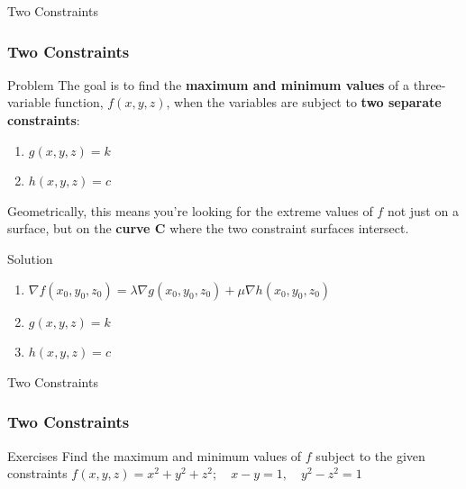 \documentclass[aspectratio=169, UTF8]{beamer}
\begin{document}
\begin{frame}{Two Constraints}
    \frametitle{Two Constraints}
    \begin{block}{Problem}
        The goal is to find the \textbf{maximum and minimum values} of a three-variable function, $f(x, y, z)$, when the variables are subject to \textbf{two separate constraints}:

        \begin{enumerate}
            \item $g(x, y, z) = k$
            \item $h(x, y, z) = c$
        \end{enumerate}

        Geometrically, this means you're looking for the extreme values of $f$ not just on a surface, but on the \textbf{curve C} where the two constraint surfaces intersect.
    \end{block}
    \begin{block}{Solution}
        \begin{enumerate}
            \item $\nabla f(x_0, y_0, z_0) = \lambda \nabla g(x_0, y_0, z_0) + \mu \nabla h(x_0, y_0, z_0)$
            \item $g(x, y, z) = k$
            \item $h(x, y, z) = c$
        \end{enumerate}
    \end{block}
\end{frame}
\begin{frame}{Two Constraints}
    \frametitle{Two Constraints}
    \begin{block}{Exercises}
        Find the maximum and minimum values of $f$ subject to the given constraints
        $f(x, y, z) = x^2 + y^2 + z^2; \quad x - y = 1, \quad y^2 - z^2 = 1$
    \end{block}
\end{frame}
\end{document}
